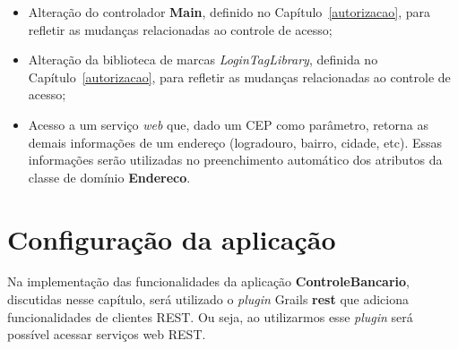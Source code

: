 \begin{itemize}
\begin{itemize}
\end{itemize}

\vspace{0.5cm}

\item     Alteração     do    controlador     {\bf     Main},    definido     no
  Capítulo~\ref{autorizacao}, para refletir as mudanças relacionadas ao controle 
  de acesso;

\vspace{0.5cm}

\item  Alteração da  biblioteca  de marcas  {\it  LoginTagLibrary}, definida  no
  Capítulo~\ref{autorizacao}, para refletir as mudanças relacionadas ao controle
  de acesso; 

\vspace{0.5cm}

\item Acesso a um serviço {\it web}  que, dado um CEP como parâmetro, retorna as
  demais  informações de um  endereço (logradouro,  bairro, cidade,  etc). Essas
  informações  serão utilizadas  no  preenchimento automático  dos atributos  da
  classe de domínio {\bf Endereco}. 

\end{itemize}

\section{Configuração da aplicação} 

\vspace{0.5cm}

    Na   implementação   das
funcionalidades da aplicação  {\bf ControleBancario}, discutidas nesse capítulo,
será utilizado o {\it plugin}  Grails {\bf rest} que adiciona funcionalidades de
clientes REST. Ou  seja, ao utilizarmos esse {\it  plugin} será possível acessar
serviços web REST. 

